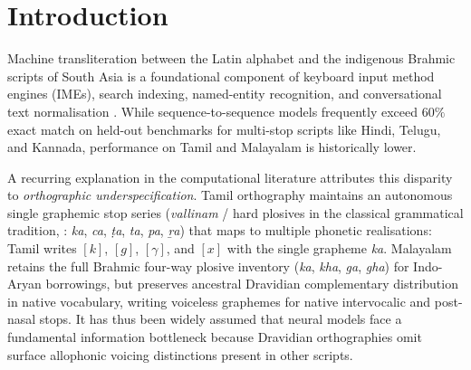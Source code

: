 \documentclass[11pt]{article}
\begin{document}
\begin{abstract}
$\text{indic}\rightarrow\text{en}$ benchmarks traces to human transcription conventions: independent annotators disagree on
$69.26\%$ of Tamil post-nasal plosive slots on identical words in Dakshina ($44.50\%$ pairwise). In contrast, conversational Tanglish from
YouTube comments exhibits an empirical $64.00\%$ voiced spelling rate post-nasally. Finally, this work provides actionable
engineering blueprints for handling this duality in practical input methods ($\text{en}\rightarrow\text{indic}$) and controlled
generation ($\text{indic}\rightarrow\text{en}$), and releases the open \textsc{ValiMeli-Speech} index ($5{,}325$ phonotactically
annotated native spoken Tamil audio recordings across 7 contributors, 96.0\% from one speaker, spanning $12{,}435$ evaluated plosive slots across $11{,}590$ core syllable positions) under CC BY-SA 4.0.
\end{abstract}

\section{Introduction}
\label{sec:intro}

Machine transliteration between the Latin alphabet and the indigenous Brahmic scripts of South
Asia is a foundational component of keyboard input method engines (IMEs), search indexing,
named-entity recognition, and conversational text normalisation
\cite{madhani-etal-2023-aksharantar,roark-etal-2020-processing,ramesh-etal-2022-samanantar}. While sequence-to-sequence models
frequently exceed $60\%$ exact match on held-out benchmarks for multi-stop scripts like Hindi,
Telugu, and Kannada, performance on Tamil and Malayalam is historically lower.

A recurring explanation in the computational literature attributes this disparity to
\emph{orthographic underspecification}. Tamil orthography maintains an autonomous single graphemic stop series
(\textit{vallinam} / hard plosives in the classical grammatical tradition, \citealt{niklas1988tamil}: \textit{ka}, \textit{ca}, \textit{\d{t}a}, \textit{ta}, \textit{pa}, \textit{\b{r}a}) that maps to multiple phonetic realisations: Tamil writes $[k]$, $[g]$, $[\gamma]$,
and $[x]$ with the single grapheme \textit{ka}. Malayalam retains the full Brahmic four-way plosive inventory
(\textit{ka}, \textit{kha}, \textit{ga}, \textit{gha}) for Indo-Aryan borrowings, but preserves ancestral Dravidian
complementary distribution in native vocabulary, writing voiceless graphemes for native intervocalic and post-nasal stops.
It has thus been widely assumed that neural models face a fundamental information bottleneck because Dravidian
orthographies omit surface allophonic voicing distinctions present in other scripts.
\end{document}
